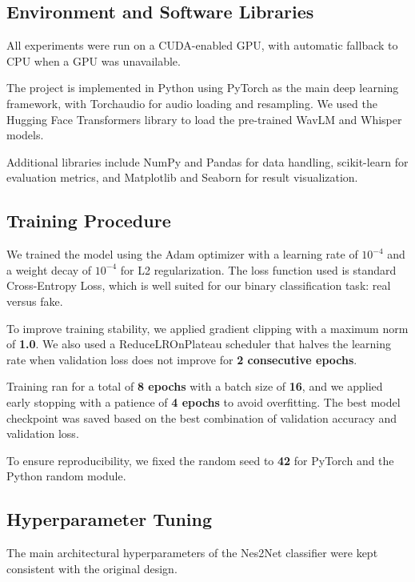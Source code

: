 \documentclass[11pt,a4paper]{article}
\begin{document}
\subsection{Environment and Software Libraries}

All experiments were run on a CUDA-enabled GPU, with automatic fallback to CPU
when a GPU was unavailable.

The project is implemented in Python using PyTorch as the main deep learning
framework, with Torchaudio for audio loading and resampling. We used the Hugging
Face Transformers library to load the pre-trained WavLM and Whisper models.

Additional libraries include NumPy and Pandas for data handling, scikit-learn for
evaluation metrics, and Matplotlib and Seaborn for result visualization.

\subsection{Training Procedure}

We trained the model using the Adam optimizer with a learning rate of $10^{-4}$
and a weight decay of $10^{-4}$ for L2 regularization. The loss function used is
standard Cross-Entropy Loss, which is well suited for our binary classification
task: real versus fake.

To improve training stability, we applied gradient clipping with a maximum norm of
\textbf{1.0}. We also used a ReduceLROnPlateau scheduler that halves the learning
rate when validation loss does not improve for \textbf{2 consecutive epochs}.

Training ran for a total of \textbf{8 epochs} with a batch size of \textbf{16},
and we applied early stopping with a patience of \textbf{4 epochs} to avoid
overfitting. The best model checkpoint was saved based on the best combination of
validation accuracy and validation loss.

To ensure reproducibility, we fixed the random seed to \textbf{42} for PyTorch
and the Python random module.

\subsection{Hyperparameter Tuning}

The main architectural hyperparameters of the Nes2Net classifier were kept
consistent with the original design.
\end{document}
